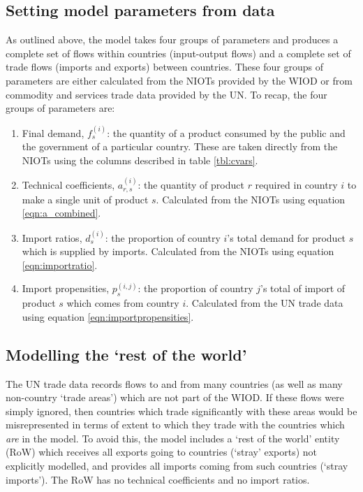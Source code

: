 \documentclass[a4paper]{article}
\begin{document}
\subsection{Setting model parameters from data}
As outlined above, the model takes four groups of parameters and produces a complete set of flows within countries (input-output flows) and a complete set of trade flows (imports and exports) between countries. These four groups of parameters are either calculated from the NIOTs provided by the WIOD or from commodity and services trade data provided by the UN.
To recap, the four groups of parameters are:
\begin{enumerate}
\item Final demand, $f_s^{(i)}$: the quantity of a product consumed by the public and the government of a particular country. These are taken directly from the NIOTs using the columns described in table \ref{tbl:cvars}.
\item Technical coefficients, $a_{r,s}^{(i)}$: the quantity of product $r$ required in country $i$ to make a single unit of product $s$. Calculated from the NIOTs using equation \eqref{eqn:a_combined}. 
\item Import ratios, $d_s^{(i)}$: the proportion of country $i$'s total demand for product $s$ which is supplied by imports. Calculated from the NIOTs using equation \eqref{eqn:importratio}.
\item Import propensities, $p_s^{(i,j)}$: the proportion of country $j$'s total of import of product $s$ which comes from country $i$. Calculated from the UN trade data using equation \eqref{eqn:importpropensities}.
\end{enumerate}

\subsection{Modelling the `rest of the world'}\label{sec:RoW}
The UN trade data records flows to and from many countries (as well as many non-country `trade areas') which are not part of the WIOD. If these flows were simply ignored, then countries which trade significantly with these areas would be misrepresented in terms of extent to which they trade with the countries which \textit{are} in the model. To avoid this, the model includes a `rest of the world' entity (RoW) which receives all exports going to countries (`stray' exports) not explicitly modelled, and provides all imports coming from such countries (`stray imports'). The RoW has no technical coefficients and no import ratios.
\end{document}
